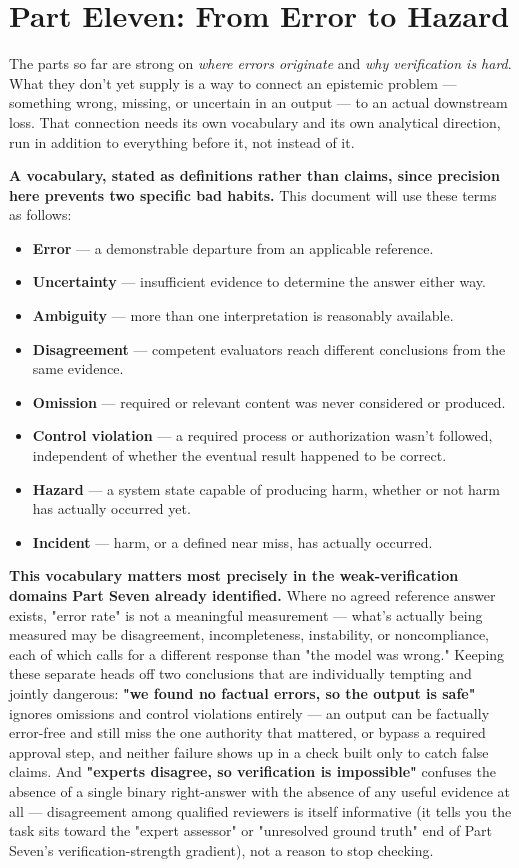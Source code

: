 \section{Part Eleven: From Error to Hazard}

The parts so far are strong on \emph{where errors originate} and \emph{why verification is hard}. What they don't yet supply is a way to connect an epistemic problem --- something wrong, missing, or uncertain in an output --- to an actual downstream loss. That connection needs its own vocabulary and its own analytical direction, run in addition to everything before it, not instead of it.

\textbf{A vocabulary, stated as definitions rather than claims, since precision here prevents two specific bad habits.} This document will use these terms as follows:

\begin{itemize}
\item \textbf{Error} --- a demonstrable departure from an applicable reference.
\item \textbf{Uncertainty} --- insufficient evidence to determine the answer either way.
\item \textbf{Ambiguity} --- more than one interpretation is reasonably available.
\item \textbf{Disagreement} --- competent evaluators reach different conclusions from the same evidence.
\item \textbf{Omission} --- required or relevant content was never considered or produced.
\item \textbf{Control violation} --- a required process or authorization wasn't followed, independent of whether the eventual result happened to be correct.
\item \textbf{Hazard} --- a system state capable of producing harm, whether or not harm has actually occurred yet.
\item \textbf{Incident} --- harm, or a defined near miss, has actually occurred.
\end{itemize}

\textbf{This vocabulary matters most precisely in the weak-verification domains Part Seven already identified.} Where no agreed reference answer exists, "error rate" is not a meaningful measurement --- what's actually being measured may be disagreement, incompleteness, instability, or noncompliance, each of which calls for a different response than "the model was wrong." Keeping these separate heads off two conclusions that are individually tempting and jointly dangerous: \textbf{"we found no factual errors, so the output is safe"} ignores omissions and control violations entirely --- an output can be factually error-free and still miss the one authority that mattered, or bypass a required approval step, and neither failure shows up in a check built only to catch false claims. And \textbf{"experts disagree, so verification is impossible"} confuses the absence of a single binary right-answer with the absence of any useful evidence at all --- disagreement among qualified reviewers is itself informative (it tells you the task sits toward the "expert assessor" or "unresolved ground truth" end of Part Seven's verification-strength gradient), not a reason to stop checking.

